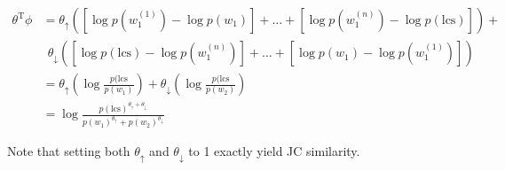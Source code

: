 \documentclass[11pt,a4paper]{article}
\begin{document}
\begin{align*}
\theta^{\textrm{T}}\phi
  &= \theta_\uparrow \left( 
    \left[\log p(w_1^{(1)}) - \log p(w_1)\right] +
    \dots +
    \left[\log p(w_1^{(n)}) - \log p(\textrm{lcs})\right]
    \right) + \\
  &~~ \theta_\downarrow \left( 
    \left[\log p(\textrm{lcs}) - \log p(w_1^{(n)}) \right] +
    \dots +
    \left[\log p(w_1) - \log p(w_1^{(1)})\right]
    \right) \\
  &= \theta_\uparrow \left( \log \frac{p(\textrm{lcs}}{p(w_1)} \right) +
     \theta_\downarrow \left( \log \frac{p(\textrm{lcs}}{p(w_2)} \right) \\
  &= \log \frac{ p(\textrm{lcs})^{\theta_\uparrow + \theta_\downarrow} }
               { p(w_1)^{\theta_\uparrow} + p(w_2)^{\theta_\downarrow} }
\end{align*}

Note that setting both $\theta_\uparrow$ and $\theta_\downarrow$ to 1 exactly
  yield JC similarity.
\end{document}
